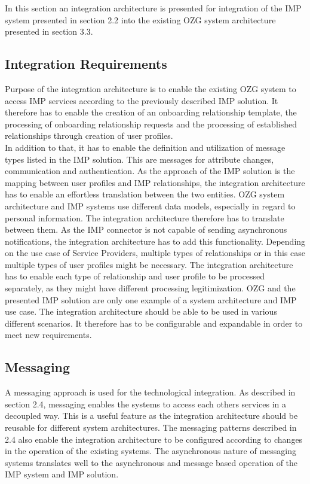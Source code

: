 In this section an integration architecture is presented for integration of the IMP system presented in section 2.2 into the existing OZG system architecture presented in section 3.3. 

\subsection{Integration Requirements}
Purpose of the integration architecture is to enable the existing OZG system to access IMP services according to the previously described IMP solution. It therefore has to enable the creation of an onboarding relationship template, the processing of onboarding relationship requests and the processing of established relationships through creation of user profiles. \\ 
In addition to that, it has to enable the definition and utilization of message types listed in the IMP solution. This are messages for attribute changes, communication and authentication. As the approach of the IMP solution is the mapping between user profiles and IMP relationships, the integration architecture has to enable an effortless translation between the two entities. OZG system architecture and IMP systems use different data models, especially in regard to personal information. The integration architecture therefore has to translate between them. As the IMP connector is not capable of sending asynchronous notifications, the integration architecture has to add this functionality. Depending on the use case of Service Providers, multiple types of relationships or in this case multiple types of user profiles might be necessary. The integration architecture has to enable each type of relationship and user profile to be processed separately, as they might have different processing legitimization. OZG and the presented IMP solution are only one example of a system architecture and IMP use case. The integration architecture should be able to be used in various different scenarios. It therefore has to be configurable and expandable in order to meet new requirements.

\subsection{Messaging}
A messaging approach is used for the technological integration. As described in section 2.4, messaging enables the systems to access each others services in a decoupled way. This is a useful feature as the integration architecture should be reusable for different system architectures. The messaging patterns described in 2.4 also enable the integration architecture to be configured according to changes in the operation of the existing systems. The asynchronous nature of messaging systems translates well to the asynchronous and message based operation of the IMP system and IMP solution.

